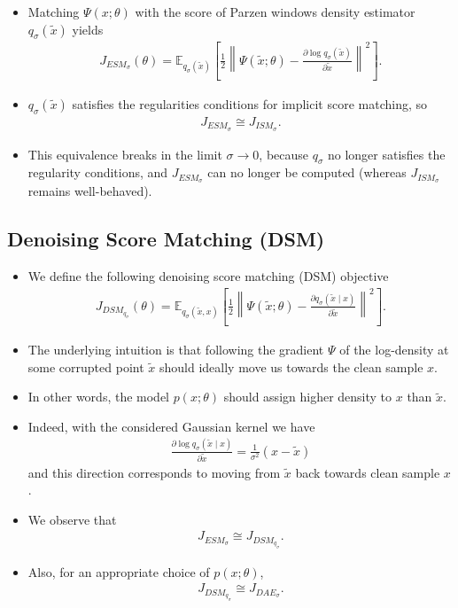 \documentclass[10pt]{article}
\newcommand{\EE}{\mathbb{E}}
\newcommand{\DAE}{J_{DAE_\sigma}}
\newcommand{\ESMP}{J_{ESM_\sigma}}
\newcommand{\ISMP}{J_{ISM_\sigma}}
\newcommand{\DSM}{J_{DSM_{q_\sigma}}}
\begin{document}
\begin{itemize}
\item Matching $\Psi(x;\theta)$ with the score of Parzen windows density estimator $q_\sigma(\tilde{x})$ yields
\begin{align*}
\ESMP(\theta) = \EE_{q_\sigma(\tilde{x})} \left[ \frac{1}{2} \left\| \Psi(\tilde{x};\theta) - \frac{\partial \log q_\sigma(\tilde{x})}{\partial \tilde{x}} \right\|^2 \right].
\end{align*}
\item $q_\sigma(\tilde{x})$ satisfies the regularities conditions for implicit score matching, so
\begin{align*}
\ESMP \cong \ISMP.
\end{align*}
\item This equivalence breaks in the limit $\sigma \rightarrow 0$, because $q_\sigma$ no longer satisfies the regularity conditions, and $\ESMP$ can no longer be computed (whereas $\ISMP$ remains well-behaved).
\end{itemize}

\subsection{Denoising Score Matching (DSM)}

\begin{itemize}
\item We define the following denoising score matching (DSM) objective
\begin{align*}
\DSM(\theta) = \EE_{q_\sigma(\tilde{x},x)} \left[ \frac{1}{2} \left\| \Psi(\tilde{x};\theta) - \frac{\partial q_\sigma(\tilde{x} \mid x)}{\partial \tilde{x}} \right\|^2 \right].
\end{align*}
\item The underlying intuition is that following the gradient $\Psi$ of the log-density at some corrupted point $\tilde{x}$ should ideally move us towards the clean sample $x$.
\item In other words, the model $p(x;\theta)$ should assign higher density to $x$ than $\tilde{x}$.
\item Indeed, with the considered Gaussian kernel we have
\begin{align*}
\frac{\partial \log q_\sigma(\tilde{x} \mid x)}{\partial \tilde{x}} = \frac{1}{\sigma^2} (x - \tilde{x})
\end{align*}
and this direction corresponds to moving from $\tilde{x}$ back towards clean sample $x$.
\item We observe that
\begin{align*}
\ESMP \cong \DSM.
\end{align*}
\item Also, for an appropriate choice of $p(x;\theta)$,
\begin{align*}
\DSM \cong \DAE.
\end{align*}
\end{itemize}
\end{document}
